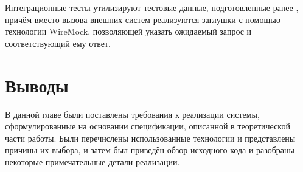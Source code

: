 Интеграционные тесты утилизируют тестовые данные, подготовленные ранее %
, причём вместо вызова внешних систем реализуются заглушки с помощью технологии WireMock, позволяющей указать ожидаемый запрос и соответствующий ему ответ.


\section{Выводы} \label{sec:ch3-conclusion}

В данной главе были поставлены требования к реализации системы, сформулированные на основании спецификации, описанной в теоретической части работы.
Были перечислены использованные технологии и представлены причины их выбора, и затем был приведён обзор исходного кода и разобраны некоторые примечательные детали реализации.
